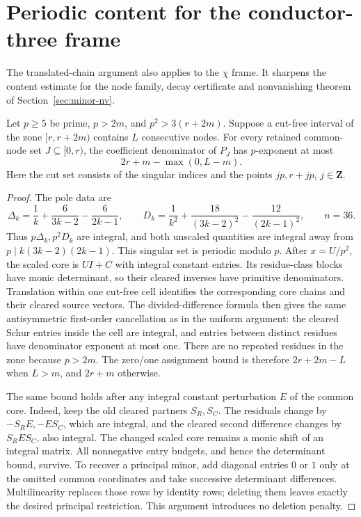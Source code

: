 \section{Periodic content for the conductor-three frame}\label{sec:chi-periodic}

The translated-chain argument also applies to the $\chi$ frame. It sharpens
the content estimate for the node family, decay certificate and nonvanishing
theorem of Section~\ref{sec:minor-nv}.

\begin{proposition}\label{prop:chi-periodic-local}
Let $p\ge5$ be prime, $p>2m$, and $p^2>3(r+2m)$. Suppose a cut-free
interval of the zone $[r,r+2m)$ contains $L$ consecutive nodes.
For every retained common-node set $J\subseteq[0,r)$, the coefficient
denominator of $P_J$ has $p$-exponent at most
\[
  2r+m-\max(0,L-m).
\]
Here the cut set consists of the singular indices and the points
$jp,r+jp$, $j\in\mathbf Z$.
\end{proposition}
\begin{proof}
The pole data are
\[
 \Delta_k=\frac1k+\frac6{3k-2}-\frac6{2k-1},\qquad
 D_k=\frac1{k^2}+\frac{18}{(3k-2)^2}-\frac{12}{(2k-1)^2},
 \qquad n=36.
\]
Thus $p\Delta_k,p^2D_k$ are integral, and both unscaled quantities are
integral away from $p\mid k(3k-2)(2k-1)$. This singular set is periodic
modulo $p$. After $x=U/p^2$, the scaled core is $UI+C$ with integral
constant entries. Its residue-class blocks have monic determinant, so
their cleared inverses have primitive denominators. Translation within
one cut-free cell identifies the corresponding core chains and their
cleared source vectors. The divided-difference formula then gives the
same antisymmetric first-order cancellation as in the uniform argument:
the cleared Schur entries inside the cell are integral, and entries
between distinct residues have denominator exponent at most one.
There are no repeated residues in the zone because $p>2m$.
The zero/one assignment bound is therefore
$2r+2m-L$ when $L>m$, and $2r+m$ otherwise.

The same bound holds after any integral constant perturbation $E$ of
the common core. Indeed, keep the old cleared partners $S_R,S_C$.
The residuals change by $-S_RE,-ES_C$, which are integral, and the
cleared second difference changes by $S_RES_C$, also integral.
The changed scaled core remains a monic shift of an integral matrix.
All nonnegative entry budgets, and hence the determinant bound, survive.
To recover a principal minor, add diagonal entries $0$ or $1$ only at
the omitted common coordinates and take successive determinant
differences. Multilinearity replaces those rows by identity rows;
deleting them leaves exactly the desired principal restriction.
This argument introduces no deletion penalty.
\end{proof}

